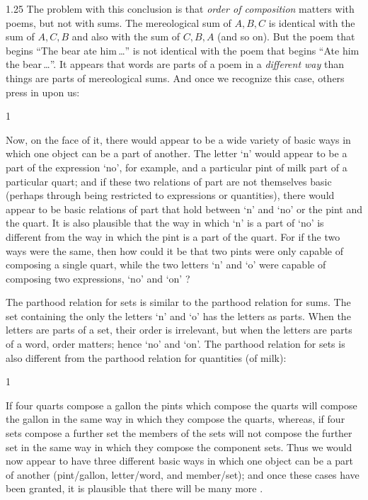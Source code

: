 \documentclass[12pt,twoside]{reedfancy}
\newenvironment{squote}{%
	\begin{spacing}{1}
	\begin{list}{}{%
	\setlength{\labelwidth}{0pt}%
	\rightmargin\leftmargin%
	}
	\item\relax
	}{%
	\end{list}%
	\end{spacing}
	}
\begin{document}
\begin{spacing}{1.25}
The problem with this conclusion is that {\em order of composition}
matters with poems, but not with sums.  The mereological sum of $A, B,
C$ is identical with the sum of $A, C, B$ and also with the sum of $C,
B, A$ (and so on).  But the poem that begins ``The bear ate
him\,\ldots '' is not identical with the poem that begins ``Ate him
the bear\,\ldots ''.  It appears that words are parts of a poem in a
{\em different way} than things are parts of mereological sums.  And
once we recognize this case, others press in upon us:

\begin{squote}
Now, on the face of it, there would appear to be a wide variety of
basic ways in which one object can be a part of another.  The letter
`n' would appear to be a part of the expression `no', for example, and
a particular pint of milk part of a particular quart; and if these two
relations of part are not themselves basic (perhaps through being
restricted to expressions or quantities), there would appear to be
basic relations of part that hold between `n' and `no' or the pint and
the quart.  It is also plausible that the way in which `n' is a part
of `no' is different from the way in which the pint is a part of the
quart.  For if the two ways were the same, then how could it be that
two pints were only capable of composing a single quart, while the two
letters `n' and `o' were capable of composing two expressions, `no'
and `on' \citep[562]{fine2010}?
\end{squote}

The parthood relation for sets is similar to the parthood relation for
sums.  The set containing the only the letters `n' and `o' has the
letters as parts.  When the letters are parts of a set, their order is
irrelevant, but when the letters are parts of a word, order matters;
hence `no' and `on'.  The parthood relation for sets is also different
from the parthood relation for quantities (of milk):

\begin{squote}
If four quarts compose a gallon the pints which compose the quarts
will compose the gallon in the same way in which they compose the
quarts, whereas, if four sets compose a further set the members of the
sets will not compose the further set in the same way in which they
compose the component sets.  Thus we would now appear to have three
different basic ways in which one object can be a part of another
(pint/gallon, letter/word, and member/set); and once these cases have
been granted, it is plausible that there will be many more
\citep[562]{fine2010}.
\end{squote}


\end{spacing}
\end{document}
